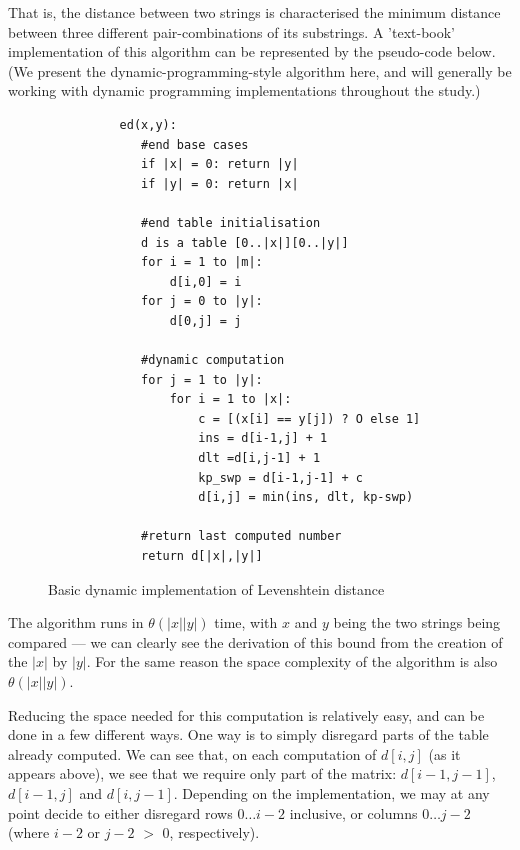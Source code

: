 \documentclass[a4paper,11pt,twoside,notitlepage]{article}
\begin{document}
        That is, the distance between two strings is characterised the
        minimum distance between three different pair-combinations of its
        substrings. A 'text-book' implementation of this algorithm can
        be represented by the pseudo-code below. (We present the
        dynamic-programming-style algorithm here, and will generally
        be working with dynamic programming implementations throughout
        the study.)
        
        \begin{figure}
          \centering
          \begin{lstlisting}
          ed(x,y):
             #end base cases
             if |x| = 0: return |y|
             if |y| = 0: return |x|    

             #end table initialisation
             d is a table [0..|x|][0..|y|]
             for i = 1 to |m|:
                 d[i,0] = i
             for j = 0 to |y|:
                 d[0,j] = j           
             
             #dynamic computation
             for j = 1 to |y|:
                 for i = 1 to |x|:
                     c = [(x[i] == y[j]) ? O else 1]
                     ins = d[i-1,j] + 1
                     dlt =d[i,j-1] + 1
                     kp_swp = d[i-1,j-1] + c
                     d[i,j] = min(ins, dlt, kp-swp)
             
             #return last computed number
             return d[|x|,|y|]
        \end{lstlisting}
        \caption{Basic dynamic implementation of Levenshtein distance}
        \label{fig:levenshtein-dynamic}
        \end{figure}

        The algorithm runs in $\theta (|x||y|)$ time, with $x$ and
        $y$ being the two strings being compared --- we can clearly
        see the derivation of this bound from the creation of the
        $|x|$ by $|y|$. For the same reason the space complexity of
        the algorithm is also $\theta (|x||y|)$.

        Reducing the space needed for this computation is relatively
        easy, and can be done in a few different ways. One way is to
        simply disregard parts of the table already computed. We can
        see that, on each computation of $d[i,j]$ (as it appears
        above), we see that we require only part of the matrix:
        $d[i-1,j-1]$, $d[i-1,j]$ and $d[i,j-1]$. Depending on the
        implementation, we may at any point decide to either disregard
        rows $0 \dots i-2$ inclusive, or columns $0 \dots j-2$ (where
        $i-2$ or $j-2$ $>$ $0$, respectively). 
\end{document}
